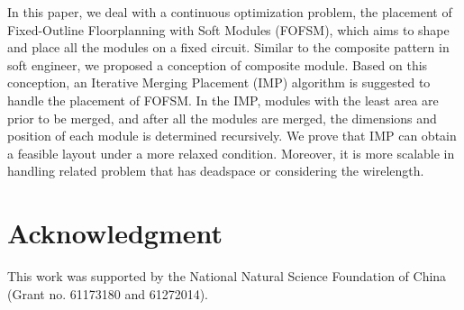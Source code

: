 \documentclass[conference]{IEEEtran}
\begin{document}
In this paper, we deal with a continuous optimization problem, the placement of Fixed-Outline Floorplanning with Soft Modules (FOFSM), which aims to shape and place all the modules on a fixed circuit. Similar to the composite pattern in soft engineer, we proposed a conception of composite module. Based on this conception, an Iterative Merging Placement (IMP) algorithm is suggested to handle the placement of FOFSM. In the IMP, modules with the least area are prior to be merged, and after all the modules are merged, the dimensions and position of each module is determined recursively. We prove that IMP can obtain a feasible layout under a more relaxed condition. Moreover, it is more scalable in handling related problem that has deadspace or considering the wirelength.






\section*{Acknowledgment}


This work was supported by the National Natural Science Foundation of China (Grant no. 61173180 and 61272014).









\end{document}
